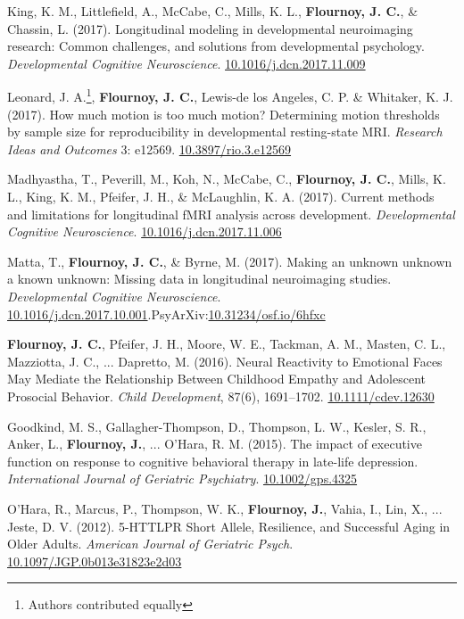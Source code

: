 \documentclass[11pt,article,oneside]{memoir}
\begin{document}
\ind King, K. M., Littlefield, A., McCabe, C., Mills, K. L., \textbf{Flournoy, J. C.}, \& Chassin, L. (2017). Longitudinal modeling in developmental neuroimaging research: Common challenges, and solutions from developmental psychology. \textit{Developmental Cognitive Neuroscience}. \href{https://doi.org/10.1016/j.dcn.2017.11.009}{10.1016/j.dcn.2017.11.009}

\ind Leonard, J. A.\footnote{Authors contributed equally}, \textbf{Flournoy, J. C.}\footnotemark[1], Lewis-de los Angeles, C. P. \& Whitaker, K. J. (2017). How much motion is too much motion? Determining motion thresholds by sample size for reproducibility in developmental resting-state MRI. \textit{Research Ideas and Outcomes} 3: e12569. \href{https://doi.org/10.3897/rio.3.e12569}{10.3897/rio.3.e12569}

\ind Madhyastha, T., Peverill, M., Koh, N., McCabe, C., \textbf{Flournoy, J. C.}, Mills, K. L., King, K. M., Pfeifer, J. H., \& McLaughlin, K. A. (2017). Current methods and limitations for longitudinal fMRI analysis across development. \textit{Developmental Cognitive Neuroscience}. \href{https://doi.org/10.1016/j.dcn.2017.11.006}{10.1016/j.dcn.2017.11.006}

\ind Matta, T., \textbf{Flournoy, J. C.}, \& Byrne, M. (2017). Making an unknown unknown a known unknown: Missing data in longitudinal neuroimaging studies. \textit{Developmental Cognitive Neuroscience}. \href{https://doi.org/10.1016/j.dcn.2017.10.001}{10.1016/j.dcn.2017.10.001}.\newline PsyArXiv:\href{https://dx.doi.org/10.31234/osf.io/6hfxc}{10.31234/osf.io/6hfxc}

\ind \textbf{Flournoy, J. C.}, Pfeifer, J. H., Moore, W. E., Tackman, A. M., Masten, C. L., Mazziotta, J. C., ... Dapretto, M. (2016). Neural Reactivity to Emotional Faces May Mediate the Relationship Between Childhood Empathy and Adolescent Prosocial Behavior. \textit{Child Development}, 87(6), 1691–1702. \newline\href{https://doi.org/10.1111/cdev.12630}{10.1111/cdev.12630}

\ind Goodkind, M. S., Gallagher-Thompson, D., Thompson, L. W., Kesler, S. R., Anker, L., \textbf{Flournoy, J.}, ... O’Hara, R. M. (2015). The impact of executive function on response to cognitive behavioral therapy in late-life depression. \textit{International Journal of Geriatric Psychiatry}. \href{http://doi.org/10.1002/gps.4325}{10.1002/gps.4325}

\ind O’Hara, R., Marcus, P., Thompson, W. K., \textbf{Flournoy, J.}, Vahia, I., Lin, X., ... Jeste, D. V. (2012). 5-HTTLPR Short Allele, Resilience, and Successful Aging in Older Adults. \textit{American Journal of Geriatric Psych}. \newline\href{http://doi.org/10.1097/JGP.0b013e31823e2d03}{10.1097/JGP.0b013e31823e2d03}
\end{document}

